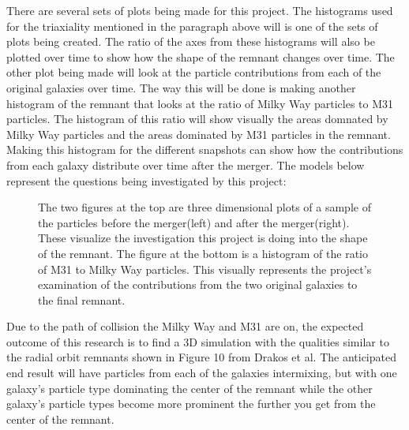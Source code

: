\documentclass[linenumbers,trackchanges]{aastex7}
\begin{document}
There are several sets of plots being made for this project. The histograms used for the triaxiality mentioned in the paragraph above will is one of the sets of plots being created. The ratio of the axes from these histograms will also be plotted over time to show how the shape of the remnant changes over time. The other plot being made will look at the particle contributions from each of the original galaxies over time. The way this will be done is making another histogram of the remnant that looks at the ratio of Milky Way particles to M31 particles. The histogram of this ratio will show visually the areas domnated by Milky Way particles and the areas dominated by M31 particles in the remnant. Making this histogram for the different snapshots can show how the contributions from each galaxy distribute over time after the merger. 
The models below represent the questions being investigated by this project:
\begin{figure}[ht!]
\caption{The two figures at the top are three dimensional plots of a sample of the particles before the merger(left) and after the merger(right). These visualize the investigation this project is doing into the shape of the remnant. The figure at the bottom is a histogram of the ratio of M31 to Milky Way particles. This visually represents the project's examination of the contributions from the two original galaxies to the final remnant.
\label{fig:general}}
\end{figure}

Due to the path of collision the Milky Way and M31 are on, the expected outcome of this research is to find a 3D simulation with the qualities similar to the radial orbit remnants shown in Figure 10 from Drakos et al. The anticipated end result will have particles from each of the galaxies intermixing, but with one galaxy’s particle type dominating the center of the remnant while the other galaxy's particle types become more prominent the further you get from the center of the remnant. 


{}



\end{document}
